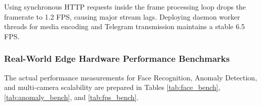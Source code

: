\documentclass[12pt,a4paper]{article}
\begin{document}
\begin{table}[h]
    \centering
    \caption{Performance Benchmark of Notification Dispatchers (Actual Experimental Results on Pi 4)}
    \label{tab:latency_results}
\end{table}

Using synchronous HTTP requests inside the frame processing loop drops the framerate to 1.2 FPS, causing major stream lags. Deploying daemon worker threads for media encoding and Telegram transmission maintains a stable 6.5 FPS.

\subsubsection*{Real-World Edge Hardware Performance Benchmarks}
The actual performance measurements for Face Recognition, Anomaly Detection, and multi-camera scalability are prepared in Tables \ref{tab:face_bench}, \ref{tab:anomaly_bench}, and \ref{tab:fps_bench}.

\begin{table}[h]
    \centering
    \caption{Face Verification Accuracy by Camera Viewing Angle (Actual Experimental Results)}
    \label{tab:face_bench}
\end{table}
\end{document}
